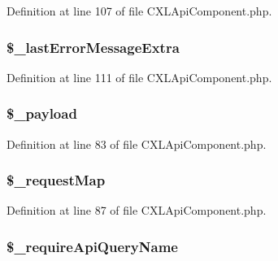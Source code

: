 Definition at line 107 of file CXLApiComponent.php.

\hypertarget{classCXLApiComponent_a15913094186791f856e0e5eb23883ba3}{
\subsubsection[{\$\_\-lastErrorMessageExtra}]{\setlength{\rightskip}{0pt plus 5cm}\$\_\-lastErrorMessageExtra}}
\label{classCXLApiComponent_a15913094186791f856e0e5eb23883ba3}


Definition at line 111 of file CXLApiComponent.php.

\hypertarget{classCXLApiComponent_a01bc135256923b2605138f01e3f81d76}{
\subsubsection[{\$\_\-payload}]{\setlength{\rightskip}{0pt plus 5cm}\$\_\-payload}}
\label{classCXLApiComponent_a01bc135256923b2605138f01e3f81d76}


Definition at line 83 of file CXLApiComponent.php.

\hypertarget{classCXLApiComponent_ae2824a887a5fbea2092a494eac8471bb}{
\subsubsection[{\$\_\-requestMap}]{\setlength{\rightskip}{0pt plus 5cm}\$\_\-requestMap}}
\label{classCXLApiComponent_ae2824a887a5fbea2092a494eac8471bb}


Definition at line 87 of file CXLApiComponent.php.

\hypertarget{classCXLApiComponent_ab068ac6d8ffe672d108a88b51f766294}{
\subsubsection[{\$\_\-requireApiQueryName}]{\setlength{\rightskip}{0pt plus 5cm}\$\_\-requireApiQueryName}}
\label{classCXLApiComponent_ab068ac6d8ffe672d108a88b51f766294}


